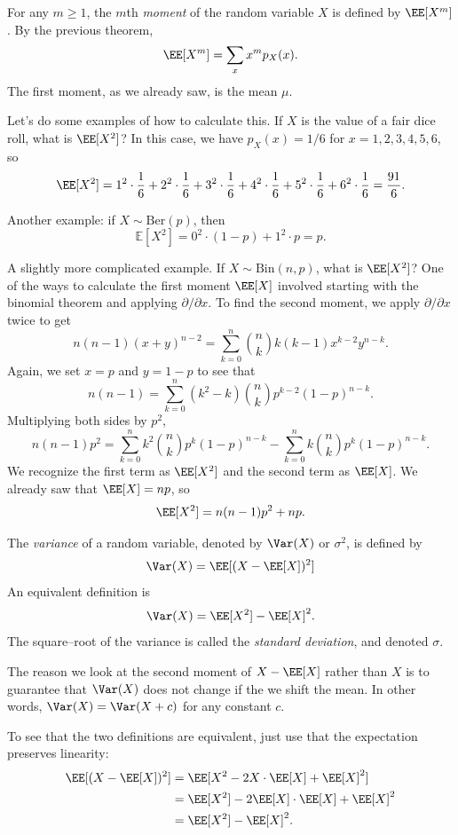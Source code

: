 \documentclass{ximera}
\begin{document}
\begin{definition}
For any $m\geq 1$, the $m$th \textit{moment} of the random variable $X$ is defined by $\EE[X^m]$. By the previous theorem,
$$
\EE[X^m] = \sum_x x^m p_X(x).
$$
The first moment, as we already saw, is the mean $\mu$. 
\end{definition}

Let's do some examples of how to calculate this. If $X$ is the value of a fair dice roll, what is $\EE[X^2]$? In this case, we have $p_X(x)=1/6$ for $x=1,2,3,4,5,6$, so 
$$
\EE[X^2] = 1^2 \cdot \frac{1}{6} + 2^2 \cdot \frac{1}{6} + 3^2 \cdot \frac{1}{6} + 4^2 \cdot \frac{1}{6} + 5^2 \cdot \frac{1}{6} + 6^2 \cdot \frac{1}{6}  = \frac{91}{6}.
$$ 

Another example: if $X \sim \text{Ber}(p)$, then 
$$
\mathbb{E}[X^2] = 0^2 \cdot (1-p) + 1^2 \cdot p = p.
$$

A slightly more complicated example. If $X \sim \text{Bin}(n,p)$, what is $\EE[X^2]$? One of the ways to calculate the first moment $\EE[X]$ involved starting with the binomial theorem and applying $\partial / \partial x$. To find the second moment, we apply $\partial / \partial x$ twice to get
$$
n(n-1)(x+y)^{n-2} = \sum_{k=0}^n \binom{n}{k} k(k-1)x^{k-2}y^{n-k}.
$$
Again, we set $x=p$ and $y=1-p$ to see that
$$
n(n-1) =  \sum_{k=0}^n (k^2-k)\binom{n}{k} p^{k-2}(1-p)^{n-k}.
$$
Multiplying both sides by $p^2$,
$$
n(n-1)p^2 = \sum_{k=0}^n k^2\binom{n}{k} p^{k}(1-p)^{n-k} - \sum_{k=0}^n k\binom{n}{k} p^{k}(1-p)^{n-k}.
$$
We recognize the first term as $\EE[X^2]$ and the second term as $\EE[X]$. We already saw that $\EE[X]=np$, so 
$$
\EE[X^2] = n(n-1)p^2 + np.
$$

\begin{definition}
The \textit{variance} of a random variable, denoted by $\Var(X)$ or $\sigma^2$, is defined by
$$
\Var(X) = \EE[(X-\EE[X])^2]
$$
An equivalent definition is 
$$
\Var(X) = \EE[X^2] - \EE[X]^2.
$$
The square--root of the variance is called the \textit{standard deviation}, and denoted $\sigma$.
\end{definition}
The reason we look at the second moment of $X-\EE[X]$ rather than $X$ is to guarantee that $\Var(X)$ does not change if the we shift the mean. In other words, $\Var(X) = \Var(X+c)$ for any constant $c$.



To see that the two definitions are equivalent, just use that the expectation preserves linearity:
\begin{align*}
\EE[(X-\EE[X])^2] &= \EE[X^2 - 2X \cdot \EE[X] + \EE[X]^2]\\
&= \EE[X^2] - 2\EE[X] \cdot \EE[X] + \EE[X]^2\\
&=\EE[X^2] - \EE[X]^2.
\end{align*}
\end{document}
